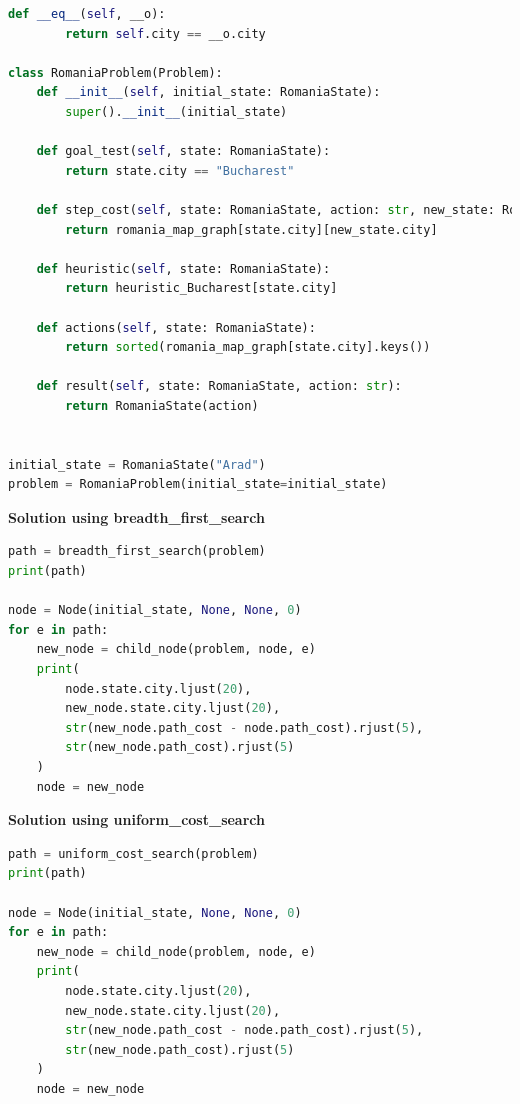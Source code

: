 \begin{lstlisting}[language=Python]
    def __eq__(self, __o):
        return self.city == __o.city

class RomaniaProblem(Problem):
    def __init__(self, initial_state: RomaniaState):
        super().__init__(initial_state)

    def goal_test(self, state: RomaniaState):
        return state.city == "Bucharest"

    def step_cost(self, state: RomaniaState, action: str, new_state: RomaniaState):
        return romania_map_graph[state.city][new_state.city]

    def heuristic(self, state: RomaniaState):
        return heuristic_Bucharest[state.city]

    def actions(self, state: RomaniaState):
        return sorted(romania_map_graph[state.city].keys())

    def result(self, state: RomaniaState, action: str):
        return RomaniaState(action)


initial_state = RomaniaState("Arad")
problem = RomaniaProblem(initial_state=initial_state)
\end{lstlisting}



{\centering \textbf{Solution using breadth\_first\_search} \par}

\begin{lstlisting}[language=Python]
path = breadth_first_search(problem)
print(path)

node = Node(initial_state, None, None, 0)
for e in path:
    new_node = child_node(problem, node, e)
    print(
        node.state.city.ljust(20),
        new_node.state.city.ljust(20),
        str(new_node.path_cost - node.path_cost).rjust(5),
        str(new_node.path_cost).rjust(5)
    )
    node = new_node
\end{lstlisting}


{\centering \textbf{Solution using uniform\_cost\_search} \par}

\begin{lstlisting}[language=Python]
path = uniform_cost_search(problem)
print(path)

node = Node(initial_state, None, None, 0)
for e in path:
    new_node = child_node(problem, node, e)
    print(
        node.state.city.ljust(20),
        new_node.state.city.ljust(20),
        str(new_node.path_cost - node.path_cost).rjust(5),
        str(new_node.path_cost).rjust(5)
    )
    node = new_node
\end{lstlisting}



